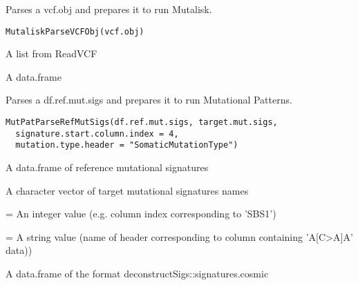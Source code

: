 \documentclass[letterpaper]{book}
\begin{document}
%
\begin{Description}\relax
Parses a vcf.obj and prepares it to run Mutalisk.
\end{Description}
%
\begin{Usage}
\begin{verbatim}
MutaliskParseVCFObj(vcf.obj)
\end{verbatim}
\end{Usage}
%
\begin{Arguments}
\begin{ldescription}
\item[\code{vcf.obj}] A list from ReadVCF
\end{ldescription}
\end{Arguments}
%
\begin{Value}
A data.frame
\end{Value}
%
\begin{Description}\relax
Parses a df.ref.mut.sigs and prepares it to run Mutational Patterns.
\end{Description}
%
\begin{Usage}
\begin{verbatim}
MutPatParseRefMutSigs(df.ref.mut.sigs, target.mut.sigs,
  signature.start.column.index = 4,
  mutation.type.header = "SomaticMutationType")
\end{verbatim}
\end{Usage}
%
\begin{Arguments}
\begin{ldescription}
\item[\code{df.ref.mut.sigs}] A data.frame of reference mutational signatures

\item[\code{target.mut.sigs}] A character vector of target mutational signatures names

\item[\code{signature.start.column.index}] = An integer value (e.g. column index corresponding to 'SBS1')

\item[\code{mutation.type.header}] = A string value
(name of header corresponding to column containing 'A[C>A]A' data))
\end{ldescription}
\end{Arguments}
%
\begin{Value}
A data.frame of the format deconstructSigs::signatures.cosmic
\end{Value}
\end{document}

